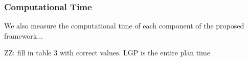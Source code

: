 \documentclass[letterpaper, 10 pt, conference]{ieeeconf}  %
\newcommand{\zz}[1]{{\color{red}ZZ: #1}}
\begin{document}



\subsubsection{Computational Time}

We also measure the computational time of each component of the proposed framework...

\zz{fill in table 3 with correct values. LGP is the entire plan time}
\end{document}
